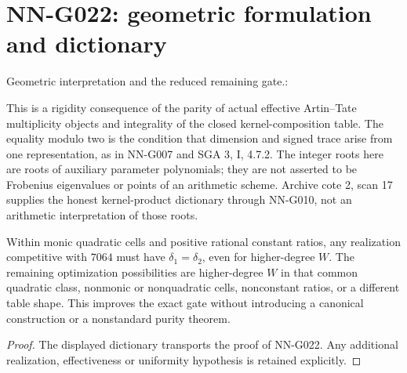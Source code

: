 \section{NN-G022: geometric formulation and dictionary}
\begin{geometricstatement}[NN-G022]
Geometric interpretation and the reduced remaining gate.:

This is a rigidity consequence of the parity of actual effective
Artin--Tate multiplicity objects and integrality of the closed
kernel-composition table. The equality modulo two is the condition
that dimension and signed trace arise from one representation,
as in NN-G007 and SGA 3, I, 4.7.2. The integer roots here are
roots of auxiliary parameter polynomials; they are not asserted
to be Frobenius eigenvalues or points of an arithmetic scheme.
Archive cote 2, scan 17 supplies the honest kernel-product
dictionary through NN-G010, not an arithmetic interpretation
of those roots.

Within monic quadratic cells and positive rational constant
ratios, any realization competitive with $7064$ must have
$\delta_1=\delta_2$, even for higher-degree $W$. The remaining
optimization possibilities are higher-degree $W$ in that common
quadratic class, nonmonic or nonquadratic cells, nonconstant
ratios, or a different table shape. This improves the exact
gate without introducing a canonical construction or a
nonstandard purity theorem.


\end{geometricstatement}
\begin{proof} The displayed dictionary transports the proof of NN-G022. Any additional realization, effectiveness or uniformity hypothesis is retained explicitly.\end{proof}


